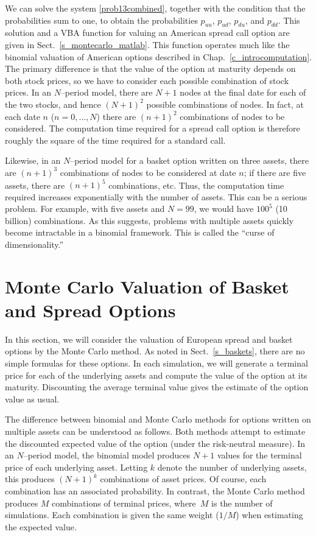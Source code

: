 We can solve the system \eqref{prob13combined}, together with the condition that the probabilities sum to one, to obtain the probabilities $p_{uu}$, $p_{ud}$, $p_{du}$, and $p_{dd}$.  This solution and a VBA function for valuing an American spread call option are given in Sect.~\ref{s_montecarlo_matlab}.  This function operates much like the binomial valuation of American options described in Chap.~\ref{c_introcomputation}.  The primary difference is that the value of the option at maturity depends on both stock prices, so we have to consider each possible combination of stock prices.  In an $N$--period model, there are $N+1$ nodes at the final date for each of the two stocks, and hence $(N+1)^2$ possible combinations of nodes.  In fact, at each date $n$ ($n=0,\ldots,N$) there are $(n+1)^2$ combinations of nodes to be considered.  
The computation time required for a spread call option is therefore roughly the square of the time required for a standard call.  

Likewise, in an $N$--period model for a basket option written on three assets, there are $(n+1)^3$ combinations of nodes to be considered at date $n$; if there are five assets, there are $(n+1)^5$ combinations, etc.  Thus, the computation time required increases exponentially with the number of assets.  This can be a serious problem.  For example, with five assets and $N=99$, we would have $100^5$ (10 billion) combinations.  As this suggests, problems with multiple assets quickly become intractable in a binomial framework.  This is called the ``curse of dimensionality.'' 

\section{Monte Carlo Valuation of Basket and Spread Options}\label{montecarlomultiple}

   In this section, we will consider the valuation of European spread and basket options by the Monte Carlo method.  As noted in Sect.~\ref{s_baskets}, there are no simple formulas for these options. In each simulation, we will generate a terminal price for each of the underlying assets and compute the value of the option at its maturity. 
Discounting the average terminal value gives the estimate of the option value as usual.  

The difference between binomial and Monte Carlo methods for options written on multiple assets can be understood as follows.  Both methods attempt to estimate the discounted expected value of the option (under the risk-neutral measure).  In an $N$--period model, the binomial model produces $N+1$ values for the terminal price of each underlying asset.  Letting $k$ denote the number of underlying assets, this produces $(N+1)^k$ combinations of asset prices.  Of course, each combination has an associated probability.  In contrast, the Monte Carlo method produces $M$ combinations of terminal prices, where~$M$ is the number of simulations.  Each combination is given the same weight ($1/M$) when estimating the expected value.  

